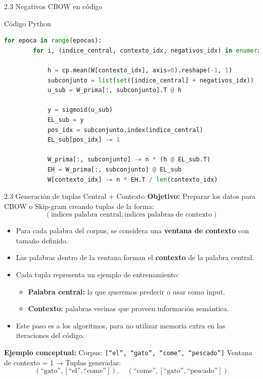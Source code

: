 \documentclass{beamer}
\begin{document}
\begin{frame}[fragile]{2.3 Negativos CBOW en código}
	\begin{block}{Código Python}
		\begin{lstlisting}[language=Python]
	for epoca in range(epocas):
		for i, (indice_central, contexto_idx, negativos_idx) in enumerate(indices_tuplas):
			
			h = cp.mean(W[contexto_idx], axis=0).reshape(-1, 1)
			subconjunto = list(set([indice_central] + negativos_idx))
			u_sub = W_prima[:, subconjunto].T @ h 
			
			y = sigmoid(u_sub)
			EL_sub = y
			pos_idx = subconjunto.index(indice_central)
			EL_sub[pos_idx] -= 1
			
			W_prima[:, subconjunto] -= n * (h @ EL_sub.T)
			EH = W_prima[:, subconjunto] @ EL_sub  
			W[contexto_idx] -= n * EH.T / len(contexto_idx)
		\end{lstlisting}
	\end{block}
\end{frame}

\begin{frame}{2.3 Generación de tuplas Central + Contexto}
	\justifying
	\textbf{Objetivo:} Preparar los datos para CBOW o Skip-gram creando tuplas de la forma:
	$$(\text{indices palabra central}, \text{indices palabras de contexto})$$

	\begin{itemize}
		\item Para cada palabra del corpus, se considera una \textbf{ventana de contexto} con tamaño definido.
		\item Las palabras dentro de la ventana forman el \textbf{contexto} de la palabra central.
		\item Cada tupla representa un ejemplo de entrenamiento:
		\begin{itemize}
			\item \textbf{Palabra central:} la que queremos predecir o usar como input.
			\item \textbf{Contexto:} palabras vecinas que proveen información semántica.
		\end{itemize}
		\item Este paso es a los algoritmos, para no utilizar memoria extra en las iteraciones del código.
	\end{itemize}
	
	\textbf{Ejemplo conceptual:}  
	Corpus: \texttt{[“el”, “gato”, “come”, “pescado”]}  
	Ventana de contexto = 1 → Tuplas generadas:  
	\[
	(\text{“gato”}, [\text{“el”}, \text{“come”}]), \quad
	(\text{“come”}, [\text{“gato”}, \text{“pescado”}])
	\]
	
\end{frame}
\end{document}
